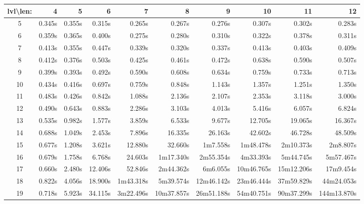 \documentclass{article} %
\theoremstyle{definition}
\theoremstyle{theorem}
\theoremstyle{remark}
\theoremstyle{remark}
\begin{document}
    \begin{table}[!htbp]
        \vspace{-5pt}
        \footnotesize
        \begin{center}
        \setlength{\tabcolsep}{3.5pt}
            \begin{tabular}{|c||r|r|r|r|r|r|r|r|r|}
                \hline
                lvl{\bf\textbackslash}len: & 4 & 5 & 6 & 7 & 8 & 9 & 10 & 11 & 12 \\ \hline \hline
                5 &0.345s &0.355s &0.315s &0.265s &0.267s &0.276s &0.307s &0.302s &0.283s \\\hline
                6 &0.359s &0.365s &0.400s &0.275s &0.280s &0.310s &0.322s &0.378s &0.311s \\\hline
                7 &0.413s &0.355s &0.447s &0.339s &0.320s &0.337s &0.413s &0.403s &0.409s \\\hline
                8 &0.412s &0.376s &0.503s &0.425s &0.461s &0.472s &0.638s &0.590s &0.507s \\\hline
                9 &0.399s &0.393s &0.492s &0.590s &0.608s &0.634s &0.759s &0.733s &0.713s \\\hline
                10 &0.434s &0.416s &0.697s &0.759s &0.848s &1.143s &1.357s &1.251s &1.350s \\\hline
                11 &0.483s &0.426s &0.842s &1.088s &2.136s &2.107s &2.353s &3.118s &3.000s \\\hline
                12 &0.490s &0.643s &0.883s &2.286s &3.103s &4.013s &5.416s &6.057s &6.824s \\\hline
                13 &0.535s &0.982s &1.577s &3.859s &6.533s &9.677s &12.705s & 19.065s &16.367s \\\hline
                14 &0.688s &1.049s &2.453s &7.896s &16.335s &26.163s &42.602s &46.728s &48.509s \\\hline
                15 &0.677s &1.208s &3.621s &12.880s &32.660s &1m7.558s &1m48.478s &2m10.373s &2m8.807s \\\hline
                16 &0.679s &1.758s &6.768s &24.603s &1m17.340s & 2m55.354s & 4m33.393s & 5m44.745s & 5m57.467s \\\hline
                17 &0.660s &2.480s &12.406s &52.846s & 2m44.362s & 6m6.055s &  10m46.765s & 15m12.206s & 17m9.454s \\\hline
                18 &0.822s &4.056s &18.900s &1m43.318s & 5m39.574s & 12m46.142s & 23m46.444s & 37m59.829s & 44m24.053s \\\hline
                19 &0.718s &5.923s &34.115s & 3m22.496s & 10m37.857s & 26m51.188s & 54m40.751s & 90m37.299s & 144m13.870s \\\hline

\end{tabular}
\end{center}
\end{table}
\end{document}
